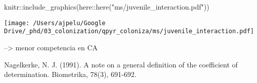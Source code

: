 \documentclass[
]{article}
\newenvironment{Shaded}{\begin{snugshade}}{\end{snugshade}}
\newcommand{\FunctionTok}[1]{\textcolor[rgb]{0.00,0.00,0.00}{#1}}
\newcommand{\NormalTok}[1]{#1}
\newcommand{\SpecialCharTok}[1]{\textcolor[rgb]{0.00,0.00,0.00}{#1}}
\newcommand{\StringTok}[1]{\textcolor[rgb]{0.31,0.60,0.02}{#1}}
\begin{document}
\begin{Shaded}
\begin{Highlighting}[]
\NormalTok{knitr}\SpecialCharTok{::}\FunctionTok{include\_graphics}\NormalTok{(here}\SpecialCharTok{::}\FunctionTok{here}\NormalTok{(}\StringTok{"ms/juvenile\_interaction.pdf"}\NormalTok{))}
\end{Highlighting}
\end{Shaded}

\texttt{[image: /Users/ajpelu/Google Drive/\_phd/03\_colonization/qpyr\_coloniza/ms/juvenile\_interaction.pdf]}

--\textgreater{} menor competencia en CA

Nagelkerke, N. J. (1991). A note on a general definition of the
coefficient of determination. Biometrika, 78(3), 691-692.

\hypertarget{refs}{}
\end{document}
